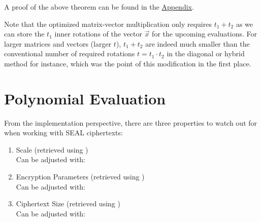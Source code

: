 A proof of the above theorem can be found in the \hyperref[chap:appendix]{Appendix}.


Note that the optimized matrix-vector multiplication only requires $t_1 + t_2$ as we can store the $t_1$ inner rotations of the vector $\vec{x}$ for the upcoming evaluations.
For larger matrices and vectors (larger $t$), $t_1 + t_2$ are indeed much smaller than the conventional number of required rotations $t = t_1 \cdot t_2$ in the diagonal or hybrid method for instance, which was the point of this modification in the first place.

\section{Polynomial Evaluation}
From the implementation perspective, there are three properties to watch out for when working with SEAL ciphertexts:

\begin{enumerate}
  \item Scale (retrieved using ) \\
        Can be adjusted with: 
  \item Encryption Parameters (retrieved using ) \\
        Can be adjusted with: 
  \item Ciphertext Size (retrieved using ) \\
        Can be adjusted with: 
\end{enumerate}

